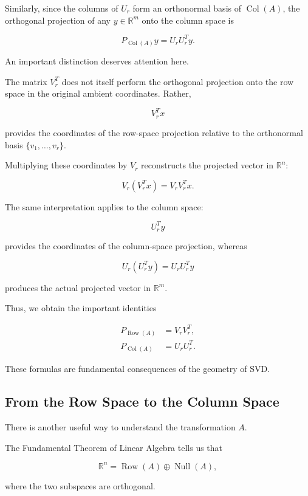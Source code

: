 \documentclass[11pt]{article}
\begin{document}
Similarly, since the columns
of $U_r$ form an orthonormal
basis of $\operatorname{Col}(A)$,
the orthogonal projection of
any $y\in\mathbb{R}^m$ onto
the column space is

\[
\boxed{
P_{\operatorname{Col}(A)}y
=
U_rU_r^Ty.
}
\]

An important distinction deserves
attention here.

The matrix $V_r^T$ does not itself
perform the orthogonal projection
onto the row space in the original
ambient coordinates. Rather,

\[
V_r^Tx
\]

provides the coordinates of the
row-space projection relative to
the orthonormal basis
$\{v_1,\ldots,v_r\}$.

Multiplying these coordinates by
$V_r$ reconstructs the projected
vector in $\mathbb{R}^n$:

\[
V_r(V_r^Tx)=V_rV_r^Tx.
\]

The same interpretation applies
to the column space:

\[
U_r^Ty
\]

provides the coordinates of the
column-space projection, whereas

\[
U_r(U_r^Ty)=U_rU_r^Ty
\]

produces the actual projected
vector in $\mathbb{R}^m$.

Thus, we obtain the important
identities

\[
\boxed{
\begin{aligned}
P_{\operatorname{Row}(A)}
&=V_rV_r^T,\\[2mm]
P_{\operatorname{Col}(A)}
&=U_rU_r^T.
\end{aligned}
}
\]

These formulas are fundamental
consequences of the geometry
of SVD.

\subsection{From the Row Space to the Column Space}

There is another useful way to
understand the transformation $A$.

The Fundamental Theorem of Linear
Algebra tells us that

\[
\mathbb{R}^n
=
\operatorname{Row}(A)
\oplus
\operatorname{Null}(A),
\]

where the two subspaces are orthogonal.
\end{document}
